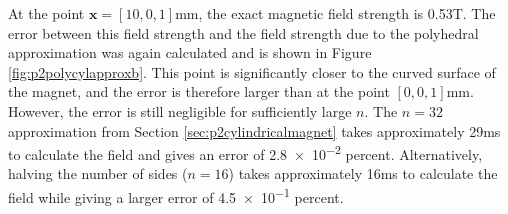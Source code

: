 At the point \(\mathbf{x} = \left[ 10,0,1\right]\)\si{\milli\metre}, the exact magnetic field strength \cite{Caciagli2018} is 0.53\si{\tesla}. The error between this field strength and the field strength due to the polyhedral approximation was again calculated and is shown in Figure \ref{fig:p2polycylapproxb}. This point is significantly closer to the curved surface of the magnet, and the error is therefore larger than at the point \(\left[ 0,0,1\right]\)\si{\milli\metre}. However, the error is still negligible for sufficiently large \(n\). The \(n = 32\) approximation from Section \ref{sec:p2cylindricalmagnet} takes approximately 29\si{\milli\second} to calculate the field and gives an error of \num{2.8e-2} percent. Alternatively, halving the number of sides (\(n = 16\)) takes approximately 16\si{\milli\second} to calculate the field while giving a larger error of \num{4.5e-1} percent.
